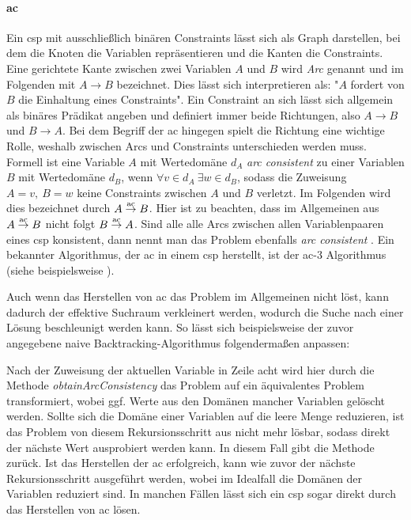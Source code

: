 \paragraph{\acl*{ac}} Ein \ac*{csp} mit ausschließlich binären Constraints lässt 
sich als Graph darstellen, bei dem die Knoten die Variablen repräsentieren und die Kanten die Constraints. Eine gerichtete Kante zwischen zwei Variablen $A$ und $B$ wird \textit{Arc}
genannt und im Folgenden mit $A \rightarrow B$ bezeichnet. Dies lässt sich interpretieren als: "$A$ fordert von $B$ die Einhaltung eines Constraints". Ein Constraint an sich lässt
sich allgemein als binäres Prädikat angeben und definiert immer beide Richtungen, also $A \rightarrow B$ und $B \rightarrow A$. Bei dem Begriff der \acl*{ac} hingegen spielt die
Richtung eine wichtige Rolle, weshalb zwischen Arcs und Constraints unterschieden werden muss. Formell ist eine Variable $A$ mit Wertedomäne $d_A$ \textit{arc consistent} zu einer
Variablen $B$ mit Wertedomäne $d_B$, wenn $\forall v \in d_A \ \exists w \in d_B$, sodass die Zuweisung $A = v, \ B = w$ keine Constraints zwischen $A$ und $B$ verletzt. Im Folgenden
wird dies bezeichnet durch $A \stackrel{\text{ac}}{\rightarrow} B$. Hier ist zu beachten, dass im Allgemeinen aus $A \stackrel{\text{ac}}{\rightarrow} B$ nicht folgt $B \stackrel{\text{ac}}{\rightarrow} A$. Sind alle alle Arcs zwischen allen Variablenpaaren
eines \ac*{csp} konsistent, dann nennt man das Problem ebenfalls \textit{arc consistent} \cite{ACOverview}. Ein bekannter Algorithmus, der \ac*{ac} in einem \ac*{csp} herstellt,
ist der \ac*{ac}-3 Algorithmus (siehe beispielsweise \cite{ac3}). 

Auch wenn das Herstellen von \ac*{ac} das Problem im Allgemeinen nicht löst, kann dadurch der effektive Suchraum verkleinert werden, wodurch die Suche nach einer Lösung beschleunigt
werden kann. So lässt sich beispielsweise der zuvor angegebene naive Backtracking-Algorithmus folgendermaßen anpassen:

Nach der Zuweisung der aktuellen Variable in Zeile acht wird hier durch die Methode \textit{obtainArcConsistency} das Problem auf ein äquivalentes Problem transformiert, wobei
ggf. Werte aus den Domänen mancher Variablen gelöscht werden. Sollte sich die Domäne einer Variablen auf die leere Menge reduzieren, ist das Problem von diesem Rekursionsschritt
aus nicht mehr lösbar, sodass direkt der nächste Wert ausprobiert werden kann. In diesem Fall gibt die Methode  zurück. Ist das Herstellen der \ac*{ac} erfolgreich,
kann wie zuvor der nächste Rekursionsschritt ausgeführt werden, wobei im Idealfall die Domänen der Variablen reduziert sind. In manchen Fällen lässt sich ein \ac*{csp} sogar
direkt durch das Herstellen von \ac*{ac} lösen.